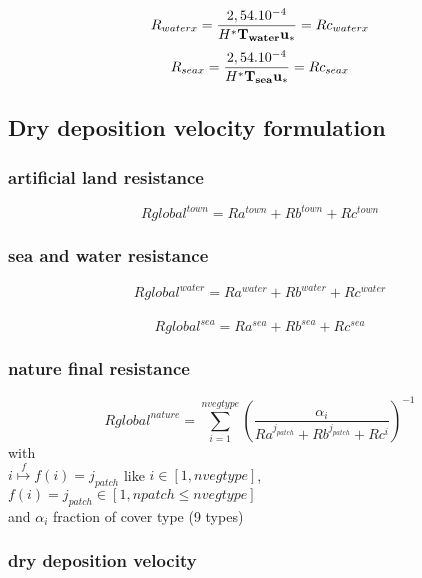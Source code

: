 \[R_{waterx} = \frac{2,54 . 10^{-4}}{H^* \bf{T_{water}} u_*}  = Rc_{waterx}\] 
\[R_{seax} = \frac{2,54 . 10^{-4}}{H^* \bf{T_{sea}} u_*}  = Rc_{seax}\]
 
\subsection{Dry deposition velocity formulation}

\subsubsection{artificial land resistance}
$$ Rglobal^{town} = Ra^{town} + Rb^{town} + Rc^{town} $$
\subsubsection{sea and water resistance}
$$Rglobal^{water} = Ra^{water} + Rb^{water} + Rc^{water}$$\\
$$Rglobal^{sea} = Ra^{sea} + Rb^{sea} + Rc^{sea}$$
\subsubsection{nature final resistance}
$$ Rglobal^{nature} = \sum_{i=1}^{nvegtype} {\left(
\frac{\alpha_i}{Ra^{j_{patch}} + Rb^{j_{patch}} + Rc^{i} }\right)^{-1}} $$
with\\
$i \stackrel{f}{\longmapsto} f(i) = j_{patch}$ like
 $i \in [1,nvegtype]$, $f(i)=j_{patch} \in [1,npatch\leq nvegtype]$ \\
and 
 $ \alpha_i $ fraction of cover type (9 types)

\subsubsection{dry deposition velocity}

